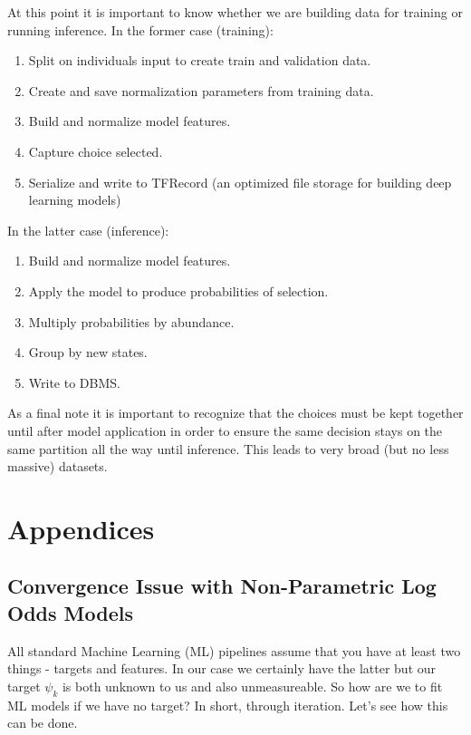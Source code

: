 \documentclass[11pt]{article}
\begin{document}
At this point it is important to know whether we are building data for training or running inference. In the former case (training):

\begin{enumerate}
\item Split on individuals input to create train and validation data.
\item Create and save normalization parameters from training data.
\item Build and normalize model features.
\item Capture choice selected.
\item Serialize and write to TFRecord (an optimized file storage for building deep learning models)
\end{enumerate}

In the latter case (inference):

\begin{enumerate}
\item Build and normalize model features.
\item Apply the model to produce probabilities of selection.
\item Multiply probabilities by abundance.
\item Group by new states.
\item Write to DBMS.
\end{enumerate}

As a final note it is important to recognize that the choices must be kept together until after model application in order to ensure the same decision stays on the same partition all the way until inference. This leads to very broad (but no less massive) datasets. 
















\newpage
\section{Appendices}

\subsection{Convergence Issue with Non-Parametric Log Odds Models} \label{convergence issues}

All standard Machine Learning (ML) pipelines assume that you have at least two things - targets and features. In our case we certainly have the latter but our target $\psi_k$ is both unknown to us and also unmeasureable. So how are we to fit ML models if we have no target? In short, through iteration. Let's see how this can be done.\newline
\end{document}
